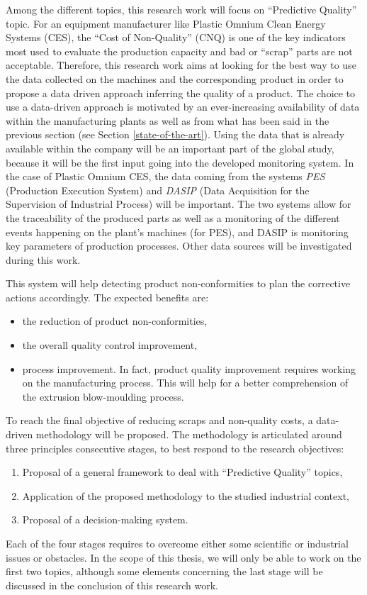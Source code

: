 %
Among the different topics, this research work will focus on ``Predictive Quality'' topic. For an equipment manufacturer like Plastic Omnium Clean Energy Systems (CES), the “Cost of Non-Quality” (CNQ) is one of the key indicators most used to evaluate the production capacity and bad or ``scrap'' parts are not acceptable. Therefore, this research work aims at looking for the best way to use the data collected  on the machines and the corresponding product in order to propose a data driven approach inferring the quality of a product. The choice to use a data-driven approach is motivated by an ever-increasing availability of data within the manufacturing plants as well as from what has been said in the previous section (see Section \ref{state-of-the-art}). Using the data that is already available within the company will be an important part of the global study, because it will be the first input going into the developed monitoring system. In the case of Plastic Omnium CES, the data coming from the systems \textit{PES} (Production Execution System) and \textit{DASIP} (Data Acquisition for the Supervision of Industrial Process) will be important. The two systems allow for the traceability of the produced parts as well as a monitoring of the different events happening on the plant’s machines (for PES), and DASIP is monitoring key parameters of production processes. Other data sources will be investigated during this work.

This system will help detecting product non-conformities to plan the corrective actions accordingly. The expected benefits are:

\begin{itemize}
    \item the reduction of product non-conformities, 
    \item the overall quality control improvement,
    \item process improvement. In fact, product quality improvement requires working on the manufacturing process. This will help for a better comprehension of the extrusion blow-moulding process. 
\end{itemize}

To reach the final objective of reducing scraps and non-quality costs, a data-driven methodology will be proposed. The methodology is articulated around three principles consecutive stages, to best respond to the research objectives:
%
\begin{enumerate}
    \item Proposal of a general framework to deal with ``Predictive Quality'' topics, 
    \item Application of the proposed methodology to the studied industrial context,
    \item Proposal of a decision-making system. 
\end{enumerate}
%
Each of the four stages requires to overcome either some scientific or industrial issues or obstacles. In the scope of this thesis, we will only be able to work on the first two topics, although some elements concerning the last stage will be discussed in the conclusion of this research work. 

